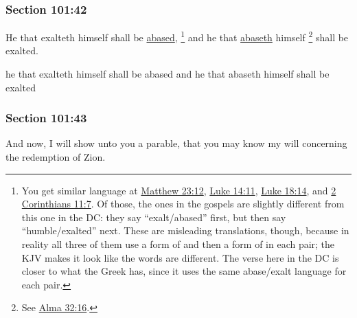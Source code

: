 	\subsubsection{Section 101:42} %
		\label{DC101-42}

		He that exalteth himself shall be \hyperref[ABASE]{abased},%
			\footnote{%
				You get similar language at \hyperref[MATTHEW-23-12]{Matthew 23:12}, \hyperref[LUKE-14-11]{Luke 14:11}, \hyperref[LUKE-18-14]{Luke 18:14}, and \hyperref[2CORINTHIANS-11-7]{2 Corinthians 11:7}. Of those, the ones in the gospels are slightly different from this one in the DC: they say ``exalt/abased'' first, but then say ``humble/exalted'' next. These are misleading translations, though, because in reality all three of them use a form of  and then a form of  in each pair; the KJV makes it look like the words are different. The verse here in the DC is closer to what the Greek has, since it uses the same abase/exalt language for each pair. 
				}
		and he that \hyperref[ABASE]{abaseth} himself%
			\footnote{%
				See \hyperref[ALMA-32-16]{Alma 32:16}.
				}
		shall be exalted.

		\begin{framed}
		\scriptsize
			\begin{compactdesc}
				\item[JSP] he that exalteth himself shall be abased and he that abaseth himself shall be exalted
			\end{compactdesc}
		\end{framed}

	\subsubsection{Section 101:43} %
		\label{DC101-43}

		And now, I will show unto you a parable, that you may know my will concerning the redemption of Zion.



